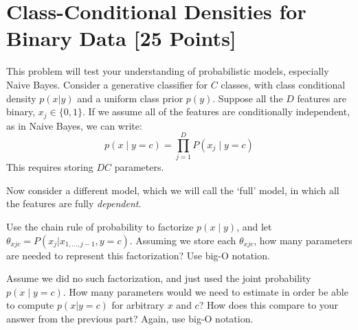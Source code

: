 \newif\ifshowsolutions
\showsolutionstrue







\pagestyle{fancy}


\section{Class-Conditional Densities for Binary Data [25 Points]}
This problem will test your understanding of probabilistic models, especially Naive Bayes.
Consider a generative classifier for $C$ classes, with class conditional density $p(x | y)$ and a uniform class prior $p(y)$. Suppose all the $D$ features are binary, $x_j \in \{0, 1 \}$. If we assume all of the features are conditionally independent, as in Naive Bayes, we can write:
$$p(x \mid y = c) = \prod_{j=1}^D P(x_j \mid y = c) $$
This requires storing $DC$ parameters. 

Now consider a different model, which we will call the `full' model, in which all the features are fully \textit{dependent}.

\problem[5] Use the chain rule of probability to factorize $p(x \mid y)$, and let $\theta_{xjc} = P(x_j | x_{1, \ldots, j - 1}, y = c)$. Assuming we store each $\theta_{xjc}$, how many parameters are needed to represent this factorization? Use big-O notation. 
\begin{subsolution}

\end{subsolution}
\newpage

\problem[5] Assume we did no such factorization, and just used the joint probability $p(x \mid y = c)$. How many parameters would we need to estimate in order be able to compute $p(x | y = c)$ for arbitrary $x$ and $c$? How does this compare to your answer from the previous part? Again, use big-O notation.
\begin{subsolution}
	
\end{subsolution}
\newpage

